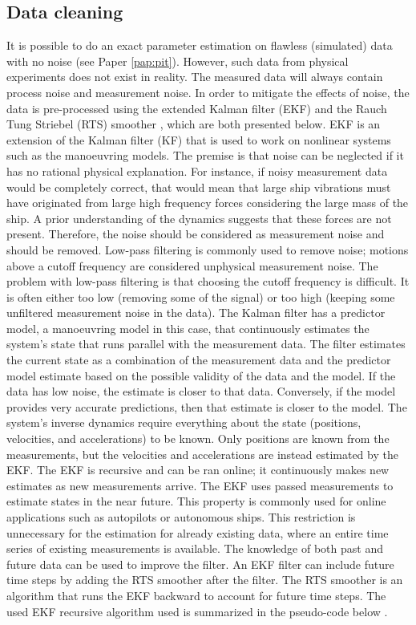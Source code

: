 \subsection{Data cleaning}
\label{sec:datacleaning}
It is possible to do an exact parameter estimation on flawless (simulated) data with no noise (see Paper \ref{pap:pit}). However, such data from physical experiments does not exist in reality. The measured data will always contain process noise and measurement noise. In order to mitigate the effects of noise, the data is pre-processed using the extended Kalman filter (EKF) \cite{brownIntroductionRandomSignals1997} and the Rauch Tung Striebel (RTS) smoother \cite{rauchMaximumLikelihoodEstimates1965}, which are both presented below.
EKF is an extension of the Kalman filter (KF) that is used to work on nonlinear systems such as the manoeuvring models. The premise is that noise can be neglected if it has no rational physical explanation. For instance, if noisy measurement data would be  completely correct, that would mean that large ship vibrations must have originated from large high frequency forces considering the large mass of the ship. A prior understanding of the dynamics suggests that these forces are not present. Therefore, the noise should be considered as measurement noise and should be removed. Low-pass filtering is commonly used to remove noise; motions above a cutoff frequency are considered unphysical measurement noise. The problem with low-pass filtering is that choosing the cutoff frequency is difficult. It is often  either too low (removing some of the signal) or too high (keeping some unfiltered measurement noise in the data). The Kalman filter has a predictor model, a manoeuvring model in this case, that continuously estimates the system’s state that runs parallel with the measurement data. The filter estimates the current state as a combination of the measurement data and the predictor model estimate based on the possible validity of the data and the model. If the data has low noise, the estimate is closer to that data. Conversely, if the model provides very accurate predictions, then that estimate is closer to the model.
The system’s inverse dynamics require everything about the state (positions, velocities, and accelerations) to be known. Only positions are known from the measurements, but the velocities and accelerations are instead estimated by the EKF.
The EKF is recursive and can be ran online; it continuously makes new estimates as new measurements arrive. The EKF uses passed measurements to estimate states in the near future. This property is commonly used for online applications such as autopilots or autonomous ships. This restriction is unnecessary for the estimation for already existing data, where an entire time series of existing measurements is available. The knowledge of both past and future data can be used to improve the filter. An EKF filter can include future time steps by adding the RTS smoother after the filter. The RTS smoother is an algorithm that runs the EKF backward to account for future time steps. The used EKF recursive algorithm used is summarized in the pseudo-code below \cite{brownIntroductionRandomSignals1997}.

